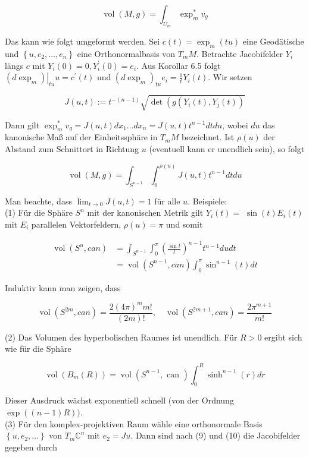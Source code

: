 \documentclass[10pt]{article}
\begin{document}
$$
\operatorname{vol}(M, g)=\int_{U_{m}} \exp _{m}^{*} v_{g}
$$

Das kann wie folgt umgeformt werden. Sei $c(t)=\exp _{m}(t u)$ eine Geodätische und $\left\{u, e_{2}, \ldots, e_{n}\right\}$ eine Orthonormalbasis von $T_{m} M$. Betrachte Jacobifelder $Y_{i}$ längs $c$ mit $Y_{i}(0)=0, Y_{i}^{\prime}(0)=e_{i}$. Aus Korollar 6.5 folgt $\left.\left(d \exp _{m}\right)\right|_{t u} u=c^{\prime}(t)$ und $\left(d \exp _{m}\right)_{t u} e_{i}=\frac{1}{t} Y_{i}(t)$. Wir setzen

$$
J(u, t):=t^{-(n-1)} \sqrt{\operatorname{det}\left(g\left(Y_{i}(t), Y_{j}(t)\right)\right.}
$$

Dann gilt $\exp _{m}^{*} v_{g}=J(u, t) d x_{1} \ldots d x_{n}=J(u, t) t^{n-1} d t d u$, wobei $d u$ das kanonische Maß auf der Einheitssphäre in $T_{m} M$ bezeichnet. Ist $\rho(u)$ der Abstand zum Schnittort in Richtung $u$ (eventuell kann er unendlich sein), so folgt


\begin{equation*}
\operatorname{vol}(M, g)=\int_{S^{n-1}} \int_{0}^{\rho(u)} J(u, t) t^{n-1} d t d u \tag{11}
\end{equation*}


Man beachte, dass $\lim _{t \rightarrow 0} J(u, t)=1$ für alle $u$. Beispiele:\\
(1) Für die Sphäre $S^{n}$ mit der kanonischen Metrik gilt $Y_{i}(t)=$ $\sin (t) E_{i}(t)$ mit $E_{i}$ parallelen Vektorfeldern, $\rho(u)=\pi$ und somit

$$
\begin{aligned}
\operatorname{vol}\left(S^{n}, c a n\right) & =\int_{S^{n-1}} \int_{0}^{\pi}\left(\frac{\sin t}{t}\right)^{n-1} t^{n-1} d u d t \\
& =\operatorname{vol}\left(S^{n-1}, c a n\right) \int_{0}^{\pi} \sin ^{n-1}(t) d t
\end{aligned}
$$

Induktiv kann man zeigen, dass

$$
\operatorname{vol}\left(S^{2 m}, c a n\right)=\frac{2(4 \pi)^{m} m!}{(2 m)!}, \quad \operatorname{vol}\left(S^{2 m+1}, c a n\right)=\frac{2 \pi^{m+1}}{m!}
$$

(2) Das Volumen des hyperbolischen Raumes ist unendlich. Für $R>0$ ergibt sich wie für die Sphäre

$$
\operatorname{vol}\left(B_{m}(R)\right)=\operatorname{vol}\left(S^{n-1}, \text { can }\right) \int_{0}^{R} \sinh ^{n-1}(r) d r
$$

Dieser Ausdruck wächst exponentiell schnell (von der Ordnung $\exp ((n-1) R))$.\\
(3) Für den komplex-projektiven Raum wähle eine orthonormale Basis $\left\{u, e_{2}, \ldots\right\}$ von $T_{m} \mathbb{C}^{n}$ mit $e_{2}=J u$. Dann sind nach (9) und (10) die Jacobifelder gegeben durch
\end{document}
